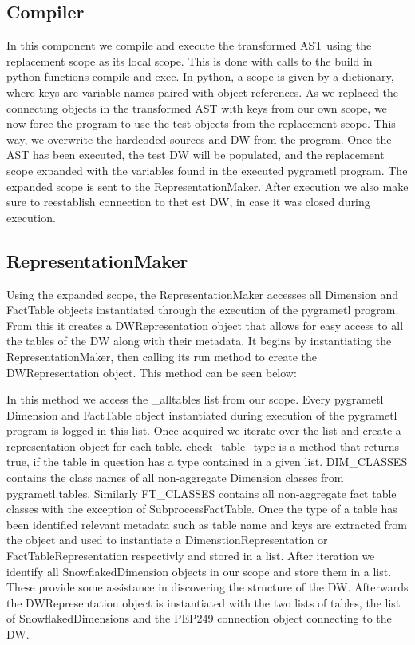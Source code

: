 \subsection{Compiler}
In this component we compile and execute the transformed AST using the replacement scope as its local scope. This is done with calls to the build in python functions compile and exec. In python, a scope is given by a dictionary, where keys are variable names paired with object references. As we replaced the connecting objects in the transformed AST with keys from our own scope, we now force the program to use the test objects from the replacement scope. This way, we overwrite the hardcoded sources and DW from the program. Once the AST has been executed, the test DW will be populated, and the replacement scope expanded with the variables found in the executed pygrametl program. The expanded scope is sent to the RepresentationMaker. After execution we also make sure to reestablish connection to thet est DW, in case it was closed during execution.

\subsection{RepresentationMaker}
Using the expanded scope, the RepresentationMaker accesses all Dimension and FactTable objects instantiated through the execution of the pygrametl program. From this it creates a DWRepresentation object that allows for easy access to all the tables of the DW along with their metadata. It begins by instantiating the RepresentationMaker, then calling its run method to create the DWRepresentation object. This method can be seen below:


In this method we access the \_alltables list from our scope. Every pygrametl Dimension and FactTable object instantiated during execution of the pygrametl program is logged in this list. Once acquired we iterate over the list and create a representation object for each table. check\_table\_type is a method that returns true, if the table in question has a type contained in a given list. DIM\_CLASSES contains the class names of all non-aggregate Dimension classes from pygrametl.tables. Similarly FT\_CLASSES contains all non-aggregate fact table classes with the exception of SubprocessFactTable. Once the type of a table has been identified relevant metadata such as table name and keys are extracted from the object and used to instantiate a DimenstionRepresentation or FactTableRepresentation respectivly and stored in a list. After iteration we identify all SnowflakedDimension objects in our scope and store them in a list. These provide some assistance in discovering the structure of the DW. Afterwards the DWRepresentation object is instantiated with the two lists of tables, the list of SnowflakedDimensions and the PEP249 connection object connecting to the DW.

